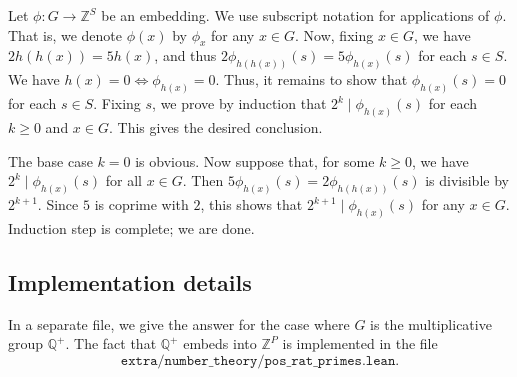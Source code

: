 \documentclass{article}
\newcommand{\Z}{\mathbb{Z}}
\newcommand{\Q}{\mathbb{Q}}
\begin{document}
Let $\phi : G \to \Z^S$ be an embedding.
We use subscript notation for applications of $\phi$.
That is, we denote $\phi(x)$ by $\phi_x$ for any $x \in G$.
Now, fixing $x \in G$, we have $2 h(h(x)) = 5 h(x)$, and thus $2 \phi_{h(h(x))}(s) = 5 \phi_{h(x)}(s)$ for each $s \in S$.
We have $h(x) = 0 \iff \phi_{h(x)} = 0$.
Thus, it remains to show that $\phi_{h(x)}(s) = 0$ for each $s \in S$.
Fixing $s$, we prove by induction that $2^k \mid \phi_{h(x)}(s)$ for each $k \geq 0$ and $x \in G$.
This gives the desired conclusion.

The base case $k = 0$ is obvious.
Now suppose that, for some $k \geq 0$, we have $2^k \mid \phi_{h(x)}(s)$ for all $x \in G$.
Then $5 \phi_{h(x)}(s) = 2 \phi_{h(h(x))}(s)$ is divisible by $2^{k + 1}$.
Since $5$ is coprime with $2$, this shows that $2^{k + 1} \mid  \phi_{h(x)}(s)$ for any $x \in G$.
Induction step is complete; we are done.



\subsection*{Implementation details}

In a separate file, we give the answer for the case where $G$ is the multiplicative group $\Q^+$.
The fact that $\Q^+$ embeds into $\Z^P$ is implemented in the file
\[ \texttt{extra/number\_theory/pos\_rat\_primes.lean}. \]
\end{document}
